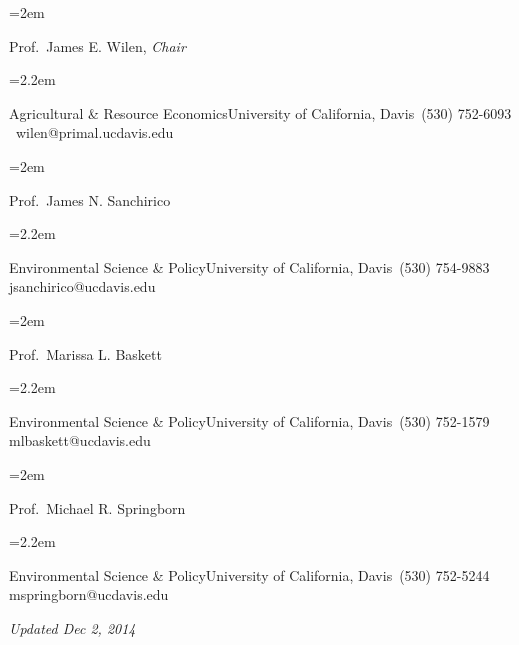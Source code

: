 \documentclass{scrartcl}
\newlength{\datebox}\settowidth{\datebox}{graduate student researcher forever love yes} %
\newcommand{\EduNewEntry}[1]{\noindent\hangindent=2em\hangafter=0 \parbox{\datebox}{#1}\vspace{0.3em}} %
\newcommand{\Description}[1]{\noindent\hangindent=2.2em\hangafter=0\noindent\raggedright\footnotesize{#1}\par\normalsize\vspace{1em}} %
\begin{document}
\begin{cv}{}
\begin{minipage}[t]{0.5\textwidth}
\EduNewEntry{Prof.~James E. Wilen, {\it Chair}}
\Description{Agricultural \& Resource Economics\newline University of California, Davis\newline \Telefon \, (530) 752-6093 \newline  \Letter \, wilen@primal.ucdavis.edu}

\EduNewEntry{Prof.~James N. Sanchirico}
\Description{Environmental Science \& Policy\newline University of California, Davis\newline  \Telefon \, (530) 754-9883 \newline  \Letter \, jsanchirico@ucdavis.edu}
\end{minipage}
\begin{minipage}[t]{0.45\textwidth}
\EduNewEntry{Prof.~Marissa L. Baskett}
\Description{Environmental Science \& Policy\newline University of California, Davis\newline  \Telefon \, (530) 752-1579 \newline   \Letter \, mlbaskett@ucdavis.edu}

\EduNewEntry{Prof.~Michael R. Springborn}
\Description{Environmental Science \& Policy\newline University of California, Davis\newline  \Telefon \, (530) 752-5244 \newline  \Letter \, mspringborn@ucdavis.edu}
\end{minipage}

\vspace{2em}
{\it Updated Dec 2, 2014}
\end{cv}
\end{document}
